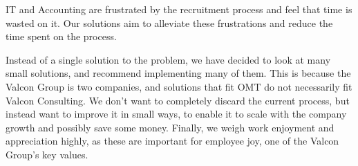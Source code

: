 IT and Accounting are frustrated by the recruitment process and feel that time is wasted on it.
Our solutions aim to alleviate these frustrations and reduce the time spent on the process.

Instead of a single solution to the problem, we have decided to look at many small solutions, and recommend implementing many of them.
This is because the Valcon Group is two companies, and solutions that fit OMT do not necessarily fit Valcon Consulting.
We don't want to completely discard the current process, but instead want to improve it in small ways, to enable it to scale with the company growth and possibly save some money.
Finally, we weigh work enjoyment and appreciation highly, as these are important for employee joy, one of the Valcon Group's key values.
